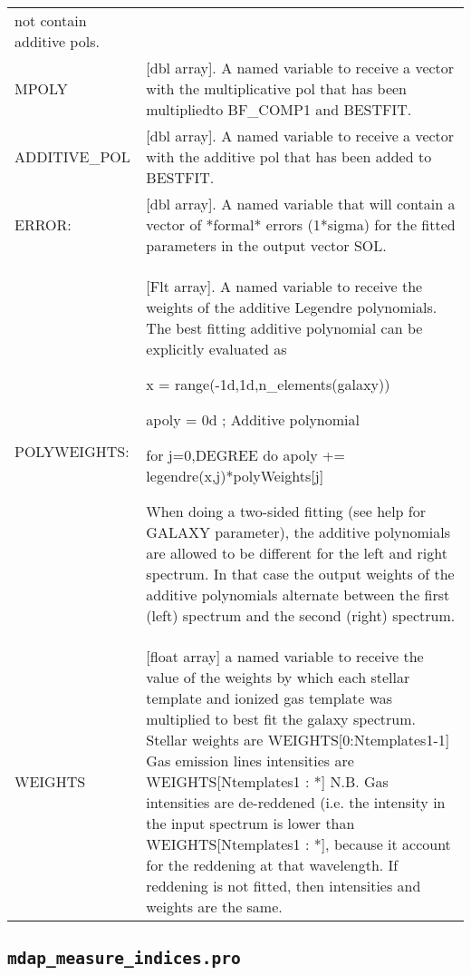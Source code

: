 \documentclass[11pt]{book}
\begin{document}
\begin{center}
\begin{longtable}{p{2.7cm}| p{11.1cm}}
       not contain additive pols.\\
%
 MPOLY &[dbl array]. A  named variable to receive a vector with the multiplicative
       pol that has been multipliedto BF\_COMP1 and BESTFIT.\\
%
 ADDITIVE\_POL &[dbl array]. A  named variable to receive a vector with the additive
      pol that has been added to BESTFIT. \\
%
ERROR: &[dbl array]. A  named variable that will contain a vector of *formal* errors
       (1*sigma) for the fitted parameters in the output vector SOL.\\
%
POLYWEIGHTS: &[Flt array]. A named variable to receive the weights of the additive Legendre polynomials.
       The best fitting additive polynomial can be explicitly evaluated as

           x = range(-1d,1d,n\_elements(galaxy))

           apoly = 0d ; Additive polynomial

           for j=0,DEGREE do apoly += legendre(x,j)*polyWeights[j]

     When doing a two-sided fitting (see help for GALAXY parameter), the additive
       polynomials are allowed to be different for the left and right spectrum.
       In that case the output weights of the additive polynomials alternate between
       the first (left) spectrum and the second (right) spectrum.\\
%
   WEIGHTS  &[float array] a named variable to receive the value of the weights by which each stellar
       template and ionized gas template was multiplied to best fit
       the galaxy spectrum.
        Stellar weights are WEIGHTS[0:Ntemplates1-1]
        Gas emission lines intensities are  WEIGHTS[Ntemplates1 : *]
        N.B. Gas intensities are de-reddened (i.e. the intensity in
        the input spectrum is lower than WEIGHTS[Ntemplates1 : *],
        because it account for the reddening at that wavelength.
        If reddening is not fitted, then intensities and weights
        are the same.\\
%
\hline
\end{longtable}
\end{center}



\subsection{{\tt mdap\_measure\_indices.pro}}
\label{dap_sec:mdap_measure_indices}
\end{document}
